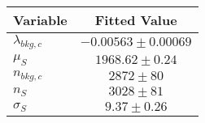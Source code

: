 \begin{tabular}[t]{lc}
\hline
Variable &Fitted Value\\
\hline\hline
$\lambda_{bkg,c}$&$-0.00563\pm0.00069$\\
\hline
$\mu_{S}$&$1968.62\pm0.24$\\
\hline
$n_{bkg,c}$&$2872\pm80$\\
\hline
$n_{S}$&$3028\pm81$\\
\hline
$\sigma_{S}$&$9.37\pm0.26$\\
\hline
\end{tabular}